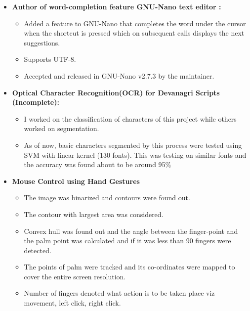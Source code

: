 \documentclass[10pt,a4paper,sans]{moderncv}        %
\begin{document}
\begin{itemize}

\item{\textbf{Author of word-completion feature GNU-Nano text editor :}%

\vspace{3pt}

		\small{\begin{itemize}

			\item Added a feature to GNU-Nano that completes the word under the cursor when the shortcut  is pressed which
		on subsequent calls displays the next suggestions.
			\item Supports UTF-8.
		 	\item Accepted and released in GNU-Nano v2.7.3 by the maintainer.
			\end{itemize}
		}}

		\vspace{6pt}

\item{\textbf{Optical Character Recognition(OCR) for Devanagri Scripts (Incomplete):}

\vspace{3pt}

		\small{
			\begin{itemize}
			\item I worked on the classification of characters of this project while others worked on segmentation.
			\item As of now, basic characters%
				segmented by this process were tested using SVM with linear kernel
				(130 fonts). This was testing on similar fonts and the accuracy was found about to be around 95\%
			\end{itemize}
			}}	

		\vspace{6pt}

\item{\textbf{Mouse Control using Hand Gestures}

\vspace{3pt}

		\small{
			\begin{itemize}
					\item The image was binarized and contours were found out.
					\item The contour with largest area was considered.
					\item  Convex hull was found out and the angle between the
					finger-point and the palm point was calculated and if it
				was less than 90\degree{} fingers were detected.  \item The
					points of palm were tracked and its co-ordinates were
					mapped to cover the entire screen resolution.
					\item Number of fingers denoted what action is to be taken place viz movement, left click, right click.
			\end{itemize}
			}}
		\vspace{6pt}


\end{itemize}
\end{document}
